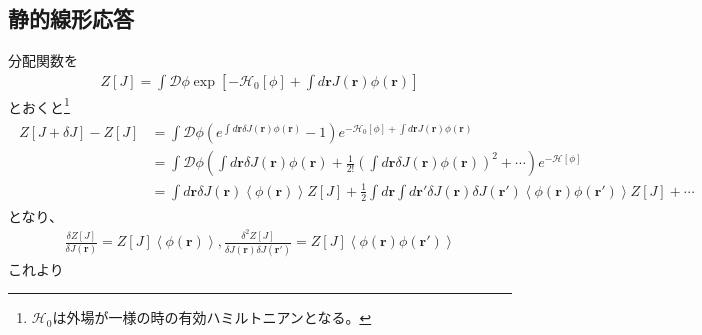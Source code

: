 \documentclass[a4paper,12pt, oneside, openany]{jsbook}
\begin{document}
\subsection{静的線形応答}
分配関数を
\begin{eqnarray}
  Z\left[J\right] =\int \mathcal{D} \phi \exp \left[-\mathcal{H}_0\left[\phi\right]+ \int d\boldsymbol{r} J(\boldsymbol{r})\phi (\boldsymbol{r})\right] 
\end{eqnarray}
とおくと\footnote{$\mathcal{H}_0$は外場が一様の時の有効ハミルトニアンとなる。}
\begin{eqnarray}
  \begin{split}
    Z\left[J+\delta J\right]-Z\left[J\right]&=\int \mathcal{D}\phi \left(e^{\int d\boldsymbol{r} \delta J(\boldsymbol{r})\phi(\boldsymbol{r})}-1\right) e^{-\mathcal{H}_0\left[\phi\right]+ \int d\boldsymbol{r} J(\boldsymbol{r})\phi (\boldsymbol{r})}\\
    &=\int \mathcal{D}\phi \left(\int d\boldsymbol{r}\delta  J (\boldsymbol{r})\phi(\boldsymbol{r})+\frac{1}{2!}\left(\int d\boldsymbol{r}\delta  J (\boldsymbol{r})\phi(\boldsymbol{r})\right)^2+ \cdots\right) e^{-\mathcal{H}\left[\phi\right]}\\
    &=\int d\boldsymbol{r}\delta J (\boldsymbol{r}) \left\langle \phi (\boldsymbol{r})\right\rangle  Z\left[J\right] +\frac{1}{2} \int d\boldsymbol{r} \int d\boldsymbol{r}' \delta J(\boldsymbol{r}) \delta J(\boldsymbol{r}') \left\langle \phi (\boldsymbol{r})\phi (\boldsymbol{r}')\right\rangle Z\left[J\right] +\cdots
  \end{split}
\end{eqnarray}
となり、
\begin{eqnarray}
  \frac{\delta Z\left[J\right]}{\delta J(\boldsymbol{r})} =Z\left[J\right] \left\langle \phi (\boldsymbol{r})\right\rangle ,\frac{\delta ^2 Z\left[J\right]}{\delta J(\boldsymbol{r}) \delta J(\boldsymbol{r}')} = Z\left[J\right]\left\langle \phi (\boldsymbol{r})\phi (\boldsymbol{r}')\right\rangle
\end{eqnarray}
これより
\end{document}
